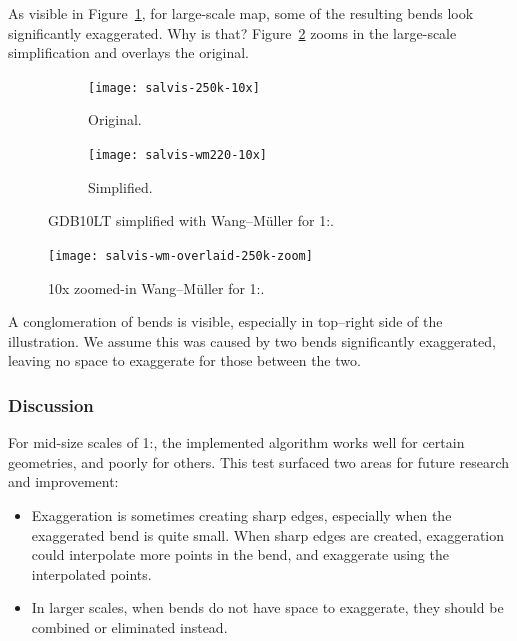 \documentclass[a4paper]{article}
\newcommand{\WM}{Wang--M{\"u}ller}
\begin{document}
As visible in Figure~\ref{fig:salvis-wm220-10x}, for large-scale map, some of the
resulting bends look significantly exaggerated. Why is that?
Figure~\ref{fig:salvis-wm220-overlaid-zoom} zooms in the large-scale
simplification and overlays the original.

\begin{figure}[ht]
    \centering
    \begin{subfigure}[b]{.49\textwidth}
        \centering
        \texttt{[image: salvis-250k-10x]}
        \caption{Original.}
    \end{subfigure}
    \hfill
    \begin{subfigure}[b]{.49\textwidth}
        \centering
        \texttt{[image: salvis-wm220-10x]}
        \caption{Simplified.}
    \end{subfigure}
    \caption{GDB10LT simplified with {\WM} for 1:.}
    \label{fig:salvis-wm220-10x}
\end{figure}

\begin{figure}[ht]
    \centering
    \texttt{[image: salvis-wm-overlaid-250k-zoom]}
    \caption{10x zoomed-in {\WM} for 1:.}
    \label{fig:salvis-wm220-overlaid-zoom}
\end{figure}

A conglomeration of bends is visible, especially in top--right side of the
illustration. We assume this was caused by two bends significantly exaggerated,
leaving no space to exaggerate for those between the two.

\subsubsection{Discussion}

For mid-size scales of 1:, the implemented algorithm works well
for certain geometries, and poorly for others. This test surfaced two areas for
future research and improvement:

\begin{itemize}

    \item Exaggeration is sometimes creating sharp edges, especially when the
        exaggerated bend is quite small. When sharp edges are created,
        exaggeration could interpolate more points in the bend, and exaggerate
        using the interpolated points.

    \item In larger scales, when bends do not have space to exaggerate, they
        should be combined or eliminated instead.

\end{itemize}
\end{document}
